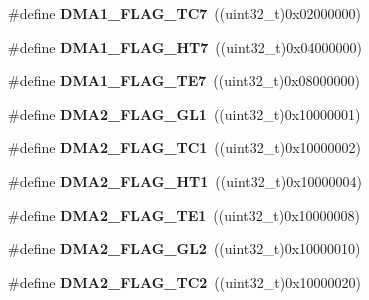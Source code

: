 \begin{DoxyCompactItemize}
\item 
\hypertarget{group__DMA__flags__definition_ga327907756920f193d5d57d8cca845ad6}{
\#define {\bfseries DMA1\_\-FLAG\_\-TC7}~((uint32\_\-t)0x02000000)}
\label{group__DMA__flags__definition_ga327907756920f193d5d57d8cca845ad6}

\item 
\hypertarget{group__DMA__flags__definition_ga1a7cbf9dffa4fc5ef1cedb46ea446387}{
\#define {\bfseries DMA1\_\-FLAG\_\-HT7}~((uint32\_\-t)0x04000000)}
\label{group__DMA__flags__definition_ga1a7cbf9dffa4fc5ef1cedb46ea446387}

\item 
\hypertarget{group__DMA__flags__definition_ga8b967e41e2d2dcc6d638a664f8e0900c}{
\#define {\bfseries DMA1\_\-FLAG\_\-TE7}~((uint32\_\-t)0x08000000)}
\label{group__DMA__flags__definition_ga8b967e41e2d2dcc6d638a664f8e0900c}

\item 
\hypertarget{group__DMA__flags__definition_ga34b82697f14e2fa9f7abeb4c43502822}{
\#define {\bfseries DMA2\_\-FLAG\_\-GL1}~((uint32\_\-t)0x10000001)}
\label{group__DMA__flags__definition_ga34b82697f14e2fa9f7abeb4c43502822}

\item 
\hypertarget{group__DMA__flags__definition_ga828c97967dbdb48d267ed0f0c4e9b8a5}{
\#define {\bfseries DMA2\_\-FLAG\_\-TC1}~((uint32\_\-t)0x10000002)}
\label{group__DMA__flags__definition_ga828c97967dbdb48d267ed0f0c4e9b8a5}

\item 
\hypertarget{group__DMA__flags__definition_ga2264376d92756f07122883c8f3359258}{
\#define {\bfseries DMA2\_\-FLAG\_\-HT1}~((uint32\_\-t)0x10000004)}
\label{group__DMA__flags__definition_ga2264376d92756f07122883c8f3359258}

\item 
\hypertarget{group__DMA__flags__definition_ga415793b309369076a9d797ad0757a9c1}{
\#define {\bfseries DMA2\_\-FLAG\_\-TE1}~((uint32\_\-t)0x10000008)}
\label{group__DMA__flags__definition_ga415793b309369076a9d797ad0757a9c1}

\item 
\hypertarget{group__DMA__flags__definition_gaa646f1ffc4468931a748ecff6440d40f}{
\#define {\bfseries DMA2\_\-FLAG\_\-GL2}~((uint32\_\-t)0x10000010)}
\label{group__DMA__flags__definition_gaa646f1ffc4468931a748ecff6440d40f}

\item 
\hypertarget{group__DMA__flags__definition_ga7da2f61b8c67923904312796fd76def3}{
\#define {\bfseries DMA2\_\-FLAG\_\-TC2}~((uint32\_\-t)0x10000020)}
\label{group__DMA__flags__definition_ga7da2f61b8c67923904312796fd76def3}


\end{DoxyCompactItemize}
